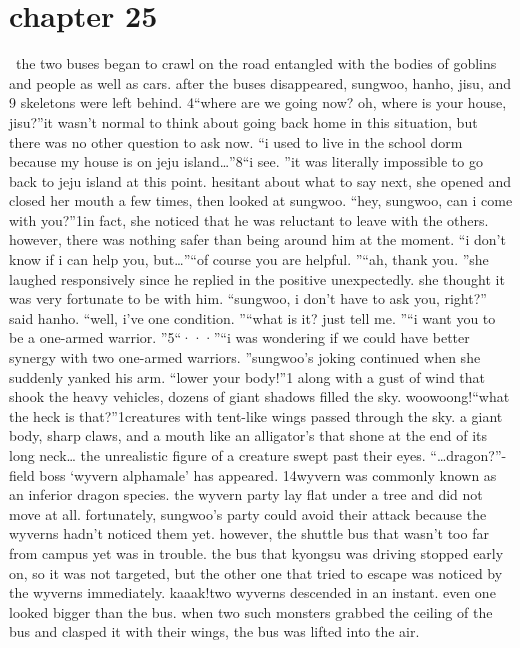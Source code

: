 \section{chapter 25}






 the two buses began to crawl on the road entangled with the bodies of goblins and people as well as cars.
after the buses disappeared, sungwoo, hanho, jisu, and 9 skeletons were left behind.
4“where are we going now? oh, where is your house, jisu?”it wasn’t normal to think about going back home in this situation, but there was no other question to ask now.
“i used to live in the school dorm because my house is on jeju island…”8“i see.
”it was literally impossible to go back to jeju island at this point.
 hesitant about what to say next, she opened and closed her mouth a few times, then looked at sungwoo.
“hey, sungwoo, can i come with you?”1in fact, she noticed that he was reluctant to leave with the others.
 however, there was nothing safer than being around him at the moment.
“i don’t know if i can help you, but…”“of course you are helpful.
”“ah, thank you.
”she laughed responsively since he replied in the positive unexpectedly.
 she thought it was very fortunate to be with him.
“sungwoo, i don’t have to ask you, right?” said hanho.
“well, i’ve one condition.
”“what is it? just tell me.
”“i want you to be a one-armed warrior.
”5“···”“i was wondering if we could have better synergy with two one-armed warriors.
”sungwoo’s joking continued when she suddenly yanked his arm.
“lower your body!”1
along with a gust of wind that shook the heavy vehicles, dozens of giant shadows filled the sky.
woowoong!“what the heck is that?”1creatures with tent-like wings passed through the sky.
 a giant body, sharp claws, and a mouth like an alligator’s that shone at the end of its long neck… the unrealistic figure of a creature swept past their eyes.
“…dragon?”-field boss ‘wyvern alphamale’ has appeared.
14wyvern was commonly known as an inferior dragon species.
 the wyvern party lay flat under a tree and did not move at all.
 fortunately, sungwoo’s party could avoid their attack because the wyverns hadn’t noticed them yet.
however, the shuttle bus that wasn’t too far from campus yet was in trouble.
 the bus that kyongsu was driving stopped early on, so it was not targeted, but the other one that tried to escape was noticed by the wyverns immediately.
kaaak!two wyverns descended in an instant.
 even one looked bigger than the bus.
when two such monsters grabbed the ceiling of the bus and clasped it with their wings, the bus was lifted into the air.
